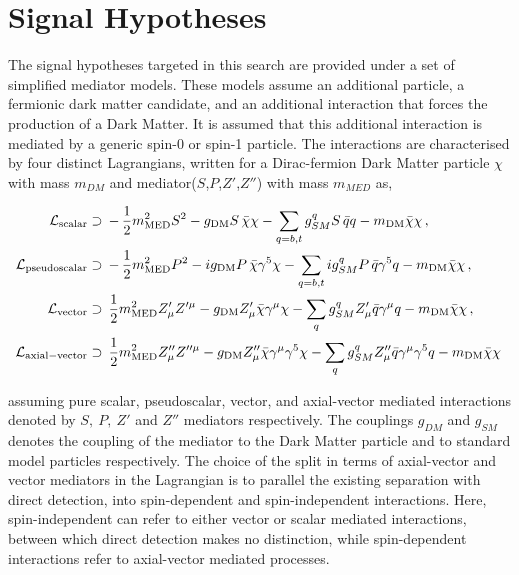 \section{Signal Hypotheses}
The signal hypotheses targeted in this search are provided under a set of simplified mediator models. These models assume an additional particle, 
a fermionic dark matter candidate, and an additional interaction that forces the production of a Dark Matter. 
It is assumed that this additional interaction is mediated by a generic spin-0 or spin-1 particle. 
The interactions are characterised by four distinct Lagrangians,
written for a Dirac-fermion Dark Matter particle $\chi$ with mass
$m_{DM}$ and mediator($S$,$P$,$Z'$,$Z''$) with mass $m_{MED}$ as, 

\begin{align}
\label{eq:LS} 
\mathcal{L}_{\mathrm{scalar}}&\supset\, -\,\frac{1}{2}m_{\rm MED}^2 S^2 - g_{\rm DM}  S \, \bar{\chi}\chi
 - \sum_{q=b,t} g_{SM}^q S \, \bar{q}q  - m_{\rm DM} \bar{\chi}\chi \,,
 \\
 \label{eq:LP} 
\mathcal{L}_{\rm{pseudoscalar}}&\supset\, -\,\frac{1}{2}m_{\rm MED}^2 P^2 - i g_{\rm DM}  P \, \bar{\chi} \gamma^5\chi
 -\sum_{q=b,t}  i g_{SM}^q  P \, \bar{q}  \gamma^5q  - m_{\rm DM} \bar{\chi}\chi\,,
 \\
 \label{eq:LV} 
\mathcal{L}_{\mathrm{vector}}&\supset \, \frac{1}{2}m_{\rm MED}^2 Z'_{\mu} Z'^{\mu} - g_{\rm DM}Z'_{\mu} \bar{\chi}\gamma^{\mu}\chi -\sum_q g_{SM}^q Z'_{\mu} \bar{q}\gamma^{\mu}q - m_{\rm DM} \bar{\chi}\chi\,,
 \\
 \label{eq:LA} 
\mathcal{L}_{\rm{axial-vector}}&\supset\,  \frac{1}{2}m_{\rm MED}^2 Z''_{\mu} Z''^{\mu} - g_{\rm DM} Z''_{\mu} \bar{\chi}\gamma^{\mu}\gamma^5\chi -\sum_q g_{SM}^q Z''_{\mu} \bar{q}\gamma^{\mu}\gamma^5q - m_{\rm DM} \bar{\chi}\chi\,
\end{align}

assuming pure scalar, pseudoscalar, vector, and axial-vector mediated interactions denoted by $S,~P,~Z'$ and $Z''$ mediators respectively. 
The couplings $g_{DM}$ and $g_{SM}$ denotes the coupling of the mediator to the Dark Matter particle and to standard model particles respectively. 
The choice of the split in terms of axial-vector and vector mediators in the Lagrangian is to parallel the existing separation with direct detection, into spin-dependent and spin-independent interactions. Here, spin-independent can refer to either vector or scalar mediated interactions, between which direct detection makes no distinction, while 
spin-dependent interactions refer to axial-vector mediated processes.
 
